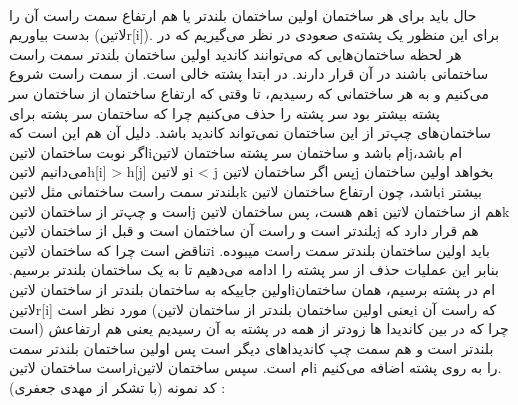 \\حال باید برای هر ساختمان اولین ساختمان بلندتر یا هم ارتفاع سمت راست آن را بدست بیاوریم (‌لاتین{r[i]}). برای این منظور یک پشته‌ی صعودی در نظر می‌گیریم که در هر لحظه ساختمان‌هایی که می‌توانند کاندید اولین ساختمان بلندتر سمت راست ساختمانی باشند در آن قرار دارند. در ابتدا پشته خالی است. از سمت راست شروع می‌کنیم و به هر ساختمانی که رسیدیم، تا وقتی که ارتفاع ساختمان از ساختمان سر پشته بیشتر بود سر پشته را حذف می‌کنیم چرا که ساختمان سر پشته برای ساختمان‌های چپ‌تر از این ساختمان نمی‌تواند کاندید باشد. دلیل آن هم این است که اگر نوبت ساختمان ‌لاتین{i}ام باشد و ساختمان سر پشته ساختمان ‌لاتین{j}ام باشد، می‌دانیم ‌لاتین{h[i] > h[j]} و ‌لاتین{i < j} پس اگر ساختمان ‌لاتین{j} بخواهد اولین ساختمان بلندتر سمت راست ساختمانی مثل ‌لاتین{k} باشد، چون ارتفاع ساختمان ‌لاتین{i} بیشتر است و چپ‌تر از ساختمان ‌لاتین{j} هم هست، پس ساختمان ‌لاتین{i} هم از ساختمان ‌لاتین{k} بلندتر است و راست آن ساختمان است و قبل از ساختمان ‌لاتین{j} هم قرار دارد که تناقض است چرا که ساختمان ‌لاتین{i} باید اولین ساختمان بلندتر سمت راست میبوده. بنابر این عملیات حذف از سر پشته را ادامه می‌دهیم تا به یک ساختمان بلندتر برسیم. اولین جاییکه به ساختمان بلندتر از ساختمان ‌لاتین{i}ام در پشته برسیم، همان ساختمان ‌لاتین{r[i]} مورد نظر است (یعنی اولین ساختمان بلندتر از ساختمان ‌لاتین{i} که راست آن است) چرا که در بین کاندیدا ها زودتر از همه در پشته به آن رسیدیم یعنی هم ارتفاعش بلندتر است و هم سمت چپ کاندیداهای دیگر است پس اولین ساختمان بلندتر سمت راست ساختمان ‌لاتین{i}ام است. سپس ساختمان ‌لاتین{i} را به روی پشته اضافه می‌کنیم. 
\\کد نمونه (با تشکر از مهدی جعفری) :‌







